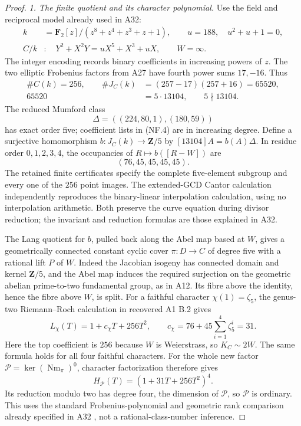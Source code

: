\documentclass[11pt,a4paper]{article}
\begin{document}
\begin{proof}
\emph{1. The finite quotient and its character polynomial.}
Use the field and reciprocal model already used in A32:
\[
 \begin{split}
 k&=\mathbf F_2[z]/(z^8+z^4+z^3+z+1),\qquad u=188,\quad u^2+u+1=0,\\
 C/k&:\quad Y^2+X^2Y=uX^5+X^3+uX,\qquad W=\infty.
 \end{split}
 \tag{NF.2}
\]
The integer encoding records binary coefficients in increasing powers
of $z$. The two elliptic Frobenius factors from A27 have fourth power
sums $17,-16$. Thus
\[
 \begin{aligned}
 \#C(k)=256,
 \qquad \#J_C(k)&=(257-17)(257+16)=65520,\\
                       65520&=5\cdot13104,
                       \qquad 5\nmid13104.
 \end{aligned}
 \tag{NF.3}
\]
The reduced Mumford class
\[
 \Delta=((224,80,1),(180,59))
 \tag{NF.4}
\]
has exact order five; coefficient lists in (NF.4) are in increasing
degree. Define a surjective homomorphism
$b:J_C(k)\to\mathbf Z/5$ by
$[13104]A=b(A)\Delta$. In residue order $0,1,2,3,4$, the
occupancies of $R\mapsto b([R-W])$ are
\[
                         (76,45,45,45,45).
 \tag{NF.5}
\]
The retained finite certificates specify the complete five-element
subgroup and every one of the $256$ point images. The extended-GCD
Cantor calculation independently reproduces the binary-linear
interpolation calculation, using no interpolation arithmetic.
Both preserve the curve equation during divisor reduction; the
invariant and reduction formulas are those explained in A32.

The Lang quotient for $b$, pulled back along the Abel map based at
$W$, gives a geometrically connected constant cyclic cover
$\pi:D\to C$ of degree five with a rational lift $P$ of $W$.
Indeed the Jacobian isogeny has connected domain and kernel
$\mathbf Z/5$, and the Abel map induces the required surjection
on the geometric abelian prime-to-two fundamental group, as in A12.
Its fibre above the identity, hence the fibre above $W$, is split.
For a faithful character $\chi(1)=\zeta_5$, the genus-two
Riemann--Roch calculation in recovered A1 B.2 gives
\cite[B.2]{A1run}
\[
 L_\chi(T)=1+c_\chi T+256T^2,
 \qquad
 c_\chi=76+45\sum_{i=1}^4\zeta_5^i=31.
 \tag{NF.6}
\]
Here the top coefficient is $256$ because $W$ is Weierstrass, so
$K_C\sim2W$. The same formula holds for all four faithful
characters. For the whole new factor
$\mathcal P=\ker(\operatorname{Nm}_\pi)^0$, character
factorization therefore gives
\[
                H_{\mathcal P}(T)=(1+31T+256T^2)^4.
 \tag{NF.7}
\]
Its reduction modulo two has degree four, the dimension of
$\mathcal P$, so $\mathcal P$ is ordinary. This uses the
standard Frobenius-polynomial and geometric rank comparison
already specified in A32
\cite[Propositions~2.2.4--2.2.5]{KatzCongruence}, not a
rational-class-number inference.


\end{proof}
\end{document}
